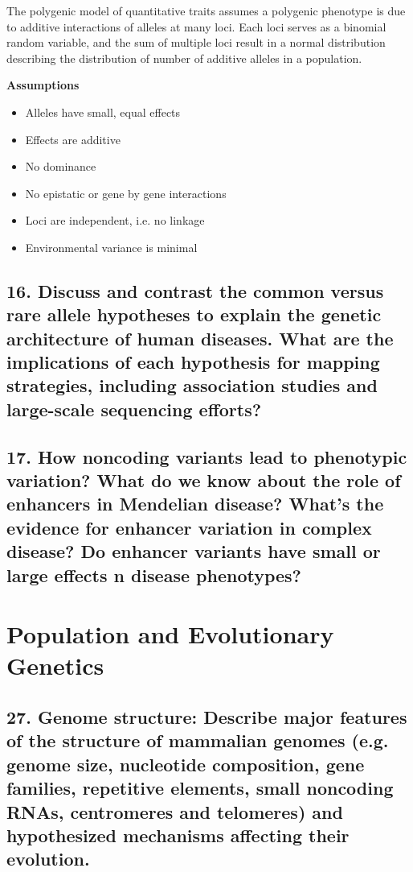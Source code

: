 \documentclass{tufte-handout}
\theoremstyle{noparens}
\begin{document}
The polygenic model of quantitative traits assumes a polygenic phenotype is due to additive interactions of alleles at many loci. Each loci serves as a binomial random variable, and the sum of multiple loci result in a normal distribution describing the distribution of number of additive alleles in a population.

\textbf{Assumptions}

\begin{itemize}
\item Alleles have small, equal effects
\item Effects are additive
\item No dominance
\item No epistatic or gene by gene interactions
\item Loci are independent, i.e. no linkage
\item Environmental variance is minimal
\end{itemize}

\newpage
\subsection{16. Discuss and contrast the common versus rare allele hypotheses to explain the genetic architecture of human diseases. What are the implications of each hypothesis for mapping strategies, including association studies and large-scale sequencing efforts?}

\newpage 
\subsection{17. How noncoding variants lead to phenotypic variation? What do we know about the role of enhancers in Mendelian disease? What's the evidence for enhancer variation in complex disease? Do enhancer variants have small or large effects n disease phenotypes?}

\newpage
\section{Population and Evolutionary Genetics}\label{sec:popgen}

\subsection{27.
Genome structure: Describe major features of the structure of mammalian genomes (e.g. 
genome size, nucleotide composition, gene families, repetitive elements, small noncoding RNAs, centromeres and telomeres) and hypothesized mechanisms affecting their evolution.}
\end{document}
